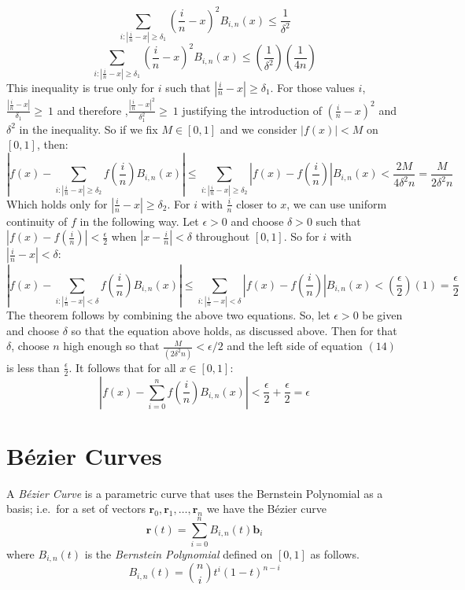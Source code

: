 \documentclass{article}
\begin{document}
\begin{equation*}
\sum_{i:|\frac{i}{n}-x|\geq\delta_1}(\frac{i}{n}-x)^2B_{i,n}(x)\leq\frac{1}{\delta^2}
\end{equation*}
\begin{equation*}
\sum_{i:|\frac{i}{n}-x|\geq\delta_1}(\frac{i}{n}-x)^2B_{i,n}(x)\leq(\frac{1}{\delta^2})(\frac{1}{4n})
\end{equation*}
This inequality is true only for $i$ such that $|\frac{i}{n}-x|\geq\delta_1$. For those values $i$, $\frac{|\frac{i}{n}-x|}{\delta_1}\geq\ 1$ and therefore ,$\frac{|\frac{i}{n}-x|^2}{\delta_1^2}\geq\ 1$ justifying the introduction of $(\frac{i}{n}-x)^2$ and $\delta^2$ in the inequality. So if we fix $M\in[0,1]$ and we consider $|f(x)|<M$ on $[0,1]$, then:
\begin{equation*}
\left|f(x)-\sum_{i:|\frac{i}{n}-x|\geq\delta_2}f(\frac{i}{n})B_{i,n}(x)\right|\leq\sum_{i:|\frac{i}{n}-x|\geq\delta_2}\left|f(x)-f(\frac{i}{n})\right|B_{i,n}(x)<\frac{2M}{4\delta^2n}=\frac{M}{2\delta^2n}
\end{equation*}
Which holds only for $|\frac{i}{n}-x|\geq\delta_2$. For $i$ with $\frac{i}{n}$ closer to $x$, we can use uniform continuity of $f$ in the following way. Let $\epsilon>0$  and choose $\delta>0$ such that $|f(x)-f(\frac{i}{n})|<\frac{\epsilon}{2}$ when $|x- \frac{i}{n}|<\delta$ throughout $[0,1]$. So for $i$ with $|\frac{i}{n}-x|<\delta$:
\begin{equation*}
\left|f(x)-\sum_{i:|\frac{i}{n}-x|<\delta}f(\frac{i}{n})B_{i,n}(x)\right|\leq\sum_{i:|\frac{i}{n}-x|<\delta}\left|f(x)-f(\frac{i}{n})\right|B_{i,n}(x)<\left(\frac{\epsilon}{2}\right)(1)= \frac{\epsilon}{2}   
\end{equation*}
The theorem follows by combining the above two equations. So, let $\epsilon>0$ be given and choose $\delta$ so that the equation above holds, as discussed above. Then for that $\delta$, choose $n$ high enough so that $\frac{M}{(2\delta^2n)}<\epsilon/2$ and the left side of equation $(14)$ is less than $\frac{\epsilon}{2}$. It follows that for all $x\in[0,1]$:
\begin{equation*}
\left|f(x)-\sum_{i=0}^nf(\frac{i}{n})B_{i,n}(x)\right|<\frac{\epsilon}{2}+\frac{\epsilon}{2}=\epsilon    
\end{equation*}

\section{B\'ezier Curves}\label{sec:bec}
A \emph{B\'ezier Curve} is a parametric curve that uses the Bernstein Polynomial as a basis; %
i.e.\ for a set of vectors $\mathbf{r}_0, \mathbf{r}_1, \dots, \mathbf{r}_n$ we have the B\'ezier curve
\begin{equation} \label{eq:bec:1}
\mathbf{r}(t) = \sum_{i=0}^{n} B_{i,n}(t) \mathbf{b}_i
\end{equation}
where $B_{i,n}(t)$ is the \emph{Bernstein Polynomial} defined on $\left[0,1 \right]$ as follows.
\[
  B_{i,n}(t) = \binom{n}{i} t^i (1 - t)^{n-i}
\]
\end{document}
